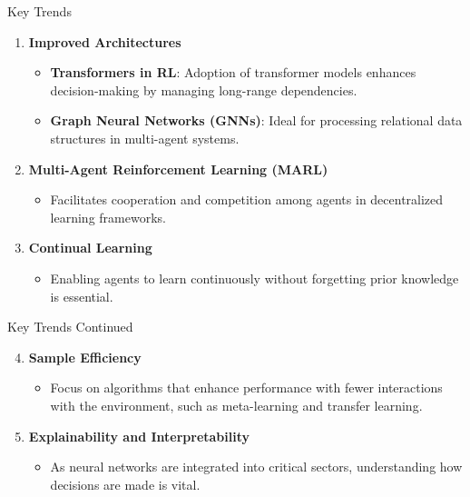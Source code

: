 \documentclass[aspectratio=169]{beamer}
\begin{document}
\begin{frame}[fragile]{Key Trends}
    \begin{enumerate}
        \item \textbf{Improved Architectures}
        \begin{itemize}
            \item \textbf{Transformers in RL}: Adoption of transformer models enhances decision-making by managing long-range dependencies.
            \item \textbf{Graph Neural Networks (GNNs)}: Ideal for processing relational data structures in multi-agent systems.
        \end{itemize}
        \item \textbf{Multi-Agent Reinforcement Learning (MARL)}
        \begin{itemize}
            \item Facilitates cooperation and competition among agents in decentralized learning frameworks.
        \end{itemize}
        \item \textbf{Continual Learning}
        \begin{itemize}
            \item Enabling agents to learn continuously without forgetting prior knowledge is essential.
        \end{itemize}
    \end{enumerate}
\end{frame}

\begin{frame}[fragile]{Key Trends Continued}
    \begin{enumerate}
        \setcounter{enumi}{3}
        \item \textbf{Sample Efficiency}
        \begin{itemize}
            \item Focus on algorithms that enhance performance with fewer interactions with the environment, such as meta-learning and transfer learning.
        \end{itemize}
        \item \textbf{Explainability and Interpretability}
        \begin{itemize}
            \item As neural networks are integrated into critical sectors, understanding how decisions are made is vital.
        \end{itemize}
    \end{enumerate}
\end{frame}
\end{document}
